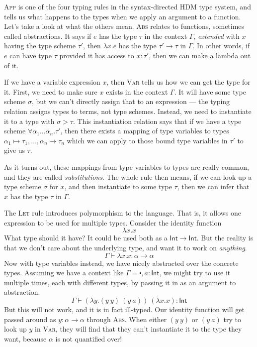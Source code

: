 \textsc{App} is one of the four typing rules in the syntax-directed
HDM type system, and tells us what happens to the types when we apply
an argument to a function. Let's take a look at what the others mean.
\textsc{Abs} relates to functions, sometimes called abstractions. It
says if $e$ has the type $\tau$ in the context $\Gamma$, \textit{extended}
with $x$ having the type scheme $\tau'$, then $\lambda x.e$ has the type ${\tau' \rightarrow
\tau}$ in $\Gamma$. In other words, if $e$ can have type $\tau$ provided it has
access to $x : \tau'$, then we can make a lambda out of it.

If we have a variable expression $x$, then \textsc{Var} tells us how
we can get the type for it. First, we need to make sure $x$ exists in
the context $\Gamma$. It will have some type scheme $\sigma$, but we can't
directly assign that to an expression --- the typing relation assigns
types to terms, not type schemes. Instead, we need to instantiate it
to a type with $\sigma > \tau$. This instantiation relation says that if we
have a type scheme $\forall \alpha_1\ldots\alpha_n . \tau'$, then there exists a mapping of
type variables to types
${\alpha_1\mapsto\tau_1,\ldots,\alpha_n\mapsto\tau_n}$ which we can apply to those bound type variables
in $\tau'$ to give us $\tau$.

As it turns out, these mappings from type
variables to types are really common, and they are called
\emph{substitutions}.  The whole rule then means, if we can look up a
type scheme $\sigma$ for $x$, and then instantiate to some type
$\tau$, then we can infer that $x$ has the type $\tau$ in $\Gamma$.

The \textsc{Let} rule introduces polymorphism to the language. That
is, it allows one expression to be used for multiple types. Consider
the identity function
\[ \lambda x . x \]
What type should it have? It could be used both as a
$\mathsf{Int} \rightarrow \mathsf{Int}$. But the reality is that we don't care
about the underlying type, and want it to work on \emph{anything}.
\[ \Gamma \vdash \lambda x . x : \alpha \rightarrow \alpha \] Now with type variables instead, we have
nicely abstracted over the concrete types. Assuming we have a context
like $\Gamma = \centerdot , a : \mathsf{Int}$, we might try to use it multiple
times, each with different types, by passing it in as an argument to
abstraction.
\[ \Gamma \vdash (\lambda y . (y \ y) \ (y \ a)) \ (\lambda x . x) : \mathsf{Int} \]
But this will not work, and it is in fact ill-typed. Our identity
function will get passed around as ${y : \alpha \rightarrow \alpha}$ through \textsc{Abs}. When
either $(y \ y)$ or $(y \ a)$ try to look up $y$ in \textsc{Var}, they
will find that they can't instantiate it to the type they want,
because $\alpha$ is not quantified over!

